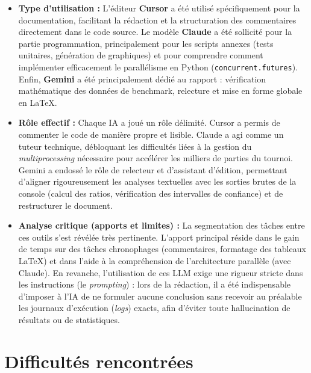 \documentclass[12pt, a4paper]{article}
\begin{document}
\begin{itemize}
  \item \textbf{Type d'utilisation :} 
        L'éditeur \textbf{Cursor} a été utilisé spécifiquement pour la documentation, facilitant la 
        rédaction et la structuration des commentaires directement dans le code source. 
        Le modèle \textbf{Claude} a été sollicité pour la partie programmation, principalement pour 
        les scripts annexes (tests unitaires, génération de graphiques) et pour comprendre comment 
        implémenter efficacement le parallélisme en Python (\texttt{concurrent.futures}). 
        Enfin, \textbf{Gemini} a été principalement dédié au rapport : vérification mathématique des 
        données de benchmark, relecture et mise en forme globale en \LaTeX.
        
  \item \textbf{Rôle effectif :} 
        Chaque IA a joué un rôle délimité. Cursor a permis de commenter le code de manière propre et lisible. 
        Claude a agi comme un tuteur technique, débloquant les difficultés liées à la gestion du 
        \textit{multiprocessing} nécessaire pour accélérer les milliers de parties du tournoi. 
        Gemini a endossé le rôle de relecteur et d'assistant d'édition, permettant d'aligner rigoureusement 
        les analyses textuelles avec les sorties brutes de la console (calcul des ratios, vérification des 
        intervalles de confiance) et de restructurer le document.
        
  \item \textbf{Analyse critique (apports et limites) :} 
        La segmentation des tâches entre ces outils s'est révélée très pertinente. L'apport principal 
        réside dans le gain de temps sur des tâches chronophages (commentaires, formatage des tableaux \LaTeX) 
        et dans l'aide à la compréhension de l'architecture parallèle (avec Claude). En revanche, 
        l'utilisation de ces LLM exige une rigueur stricte dans les instructions (le \textit{prompting}) : 
        lors de la rédaction, il a été indispensable d'imposer à l'IA de ne formuler aucune conclusion sans 
        recevoir au préalable les journaux d'exécution (\textit{logs}) exacts, afin d'éviter toute 
        hallucination de résultats ou de statistiques.
\end{itemize}


\section{Difficultés rencontrées}
\label{sec:difficultes}
\end{document}
